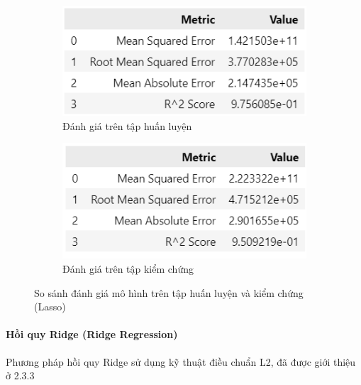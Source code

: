 \begin{figure}[H]
    \centering
    \begin{subfigure}[b]{0.48\textwidth}
        \centering
        \includegraphics[width=\linewidth]{img_multiple/metrics_lasso_train.png}
        \caption{Đánh giá trên tập huấn luyện}
    \end{subfigure}
    \hfill
    \begin{subfigure}[b]{0.48\textwidth}
        \centering
        \includegraphics[width=\linewidth]{img_multiple/metrics_lasso_val.png}
        \caption{Đánh giá trên tập kiểm chứng}
    \end{subfigure}
    \caption{So sánh đánh giá mô hình trên tập huấn luyện và kiểm chứng (Lasso)} 
\end{figure}

\paragraph{Hồi quy Ridge (Ridge Regression)}
Phương pháp hồi quy Ridge sử dụng kỹ thuật điều chuẩn L2, đã được giới thiệu ở 2.3.3

